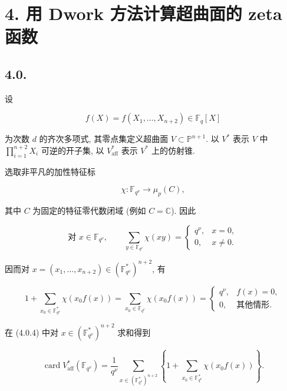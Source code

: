 \section*{4. 用 Dwork 方法计算超曲面的 zeta 函数}

\subsection*{4.0.}
设

\begin{equation}\tag{4.0.1}
f(X)=f(X_1,\ldots,X_{n+2})\in\mathbb F_q[X]
\end{equation}

为次数 $d$ 的齐次多项式, 其零点集定义超曲面 $V\subset\mathbb P^{n+1}$.
以 $V^*$ 表示 $V$ 中 $\prod_{i=1}^{n+2}X_i$ 可逆的开子集,
以 $V^*_{\mathrm{aff}}$ 表示 $V^*$ 上的仿射锥.

选取非平凡的加性特征标

\begin{equation}\tag{4.0.2}
\chi:\mathbb F_{q^\nu}\longrightarrow\mu_p(C),
\end{equation}

其中 $C$ 为固定的特征零代数闭域 (例如 $C=\mathbb C$). 因此

\begin{equation}\tag{4.0.3}
\text{对 }x\in\mathbb F_{q^\nu},\qquad
\sum_{y\in\mathbb F_{q^\nu}}\chi(xy)=
\begin{cases}
q^\nu,&x=0,\\
0,&x\ne0.
\end{cases}
\end{equation}

因而对 $x=(x_1,\ldots,x_{n+2})\in(\mathbb F_{q^\nu}^*)^{n+2}$, 有

\begin{equation}\tag{4.0.4}
1+\sum_{x_0\in\mathbb F_{q^\nu}^*}\chi(x_0f(x))
=\sum_{x_0\in\mathbb F_{q^\nu}}\chi(x_0f(x))
=
\begin{cases}
q^\nu,&f(x)=0,\\
0,&\text{其他情形}.
\end{cases}
\end{equation}

在 (4.0.4) 中对 $x\in(\mathbb F_{q^\nu}^*)^{n+2}$ 求和得到

\begin{equation}\tag{4.0.5}
\operatorname{card}V^*_{\mathrm{aff}}(\mathbb F_{q^\nu})
=\frac1{q^\nu}
\sum_{x\in(\mathbb F_{q^\nu}^*)^{n+2}}
\left\{1+\sum_{x_0\in\mathbb F_{q^\nu}^*}\chi(x_0f(x))\right\}.
\end{equation}

